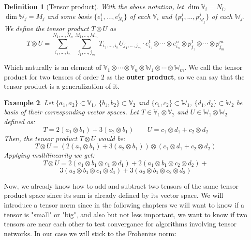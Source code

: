 \documentclass[11pt,a4paper,openright,oneside]{book}
\numberwithin{equation}{section}
\newtheorem{defn0}{Definition}[chapter]
\newtheorem{example0}[defn0]{Example}
\newenvironment{definition}{ \begin{defn0}}{\end{defn0}}
\newenvironment{example}{ \begin{example0}\rm}{\end{example0}}
\begin{document}
\begin{definition}[Tensor product] With the above notation, let $\dim \mathbb{V}_i = N_i$, $\dim \mathbb{W}_j = M_j$
    and some basis $\{e_1^i, \dots, e_{N_i}^i\}$ of each $\mathbb{V}_i$ and $\{p_1^j, \dots, p_{M_j}^j\}$ of each $\mathbb{W}_j$.
    We define the tensor product
    $T \otimes U$ as
    \begin{equation}
        T \otimes U = \sum_{i_1, \dots, i_n}^{N_1, \dots, N_n} \sum_{j_1, \dots, j_m}^{M_1, \dots, M_m} T_{i_1, \dots, i_n} U_{j_1, \dots, j_m} \cdot
    e_{i_1}^1 \otimes \cdots \otimes e_{i_n}^n \otimes p_{j_1}^1 \otimes \cdots \otimes p_{j_m}^m
    \label{eq:tensor_product}
\end{equation}
\end{definition}

Which naturally is an element of $\mathbb{V}_1 \otimes \cdots \otimes \mathbb{V}_n \otimes \mathbb{W}_1 \otimes \cdots \otimes \mathbb{W}_m$.
We call the tensor product for two tensors of order $2$ as the \textbf{outer product}, so we can say that 
the tensor product is a generalization of it.

\begin{example}
    Let $\{a_1, a_2\} \subset \mathbb{V}_1$, $\{b_1, b_2\} \subset \mathbb{V}_2$ and $\{c_1, c_2\} \subset \mathbb{W}_1$, $\{d_1, d_2\} \subset \mathbb{W}_2$ be basis
    of their corresponding vector spaces. Let $T \in \mathbb{V}_1 \otimes \mathbb{V}_2$ and $U \in \mathbb{W}_1 \otimes \mathbb{W}_2$ defined as:
    $$T = 2 (a_1 \otimes b_1) + 3 (a_2 \otimes b_1) \qquad U = c_1 \otimes d_1 + c_2 \otimes d_2$$
    Then, the tensor product $T \otimes U$ would be:
    $$T \otimes U = (2(a_1 \otimes b_1) + 3(a_2 \otimes b_1)) \otimes (c_1 \otimes d_1 + c_2 \otimes d_2)$$
    Applying multilinearity we get:
    $$T \otimes U = 2 (a_1 \otimes b_1 \otimes c_1 \otimes d_1) + 2 (a_1 \otimes b_1 \otimes c_2 \otimes d_2) + $$$$
    3 (a_2 \otimes b_1 \otimes c_1 \otimes d_1) + 3 (a_2 \otimes b_1 \otimes c_2 \otimes d_2)$$
\end{example}

Now, we already know how to add and subtract two tensors of the same tensor product space since its sum is already
defined by its vector space. We will introduce a tensor norm since in the following chapters we will want to know if
a tensor is "small" or "big", and also but not less important, we want to know if two tensors are near each other
to test convergance for algorithms involving tensor networks. In our case we will stick to the Frobenius norm:
\end{document}
